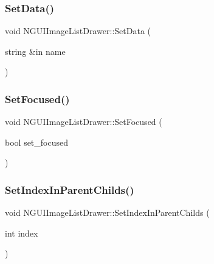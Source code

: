 \hypertarget{class_n_g_u_i_image_list_drawer_aa61af0b4d9172fee0f9d5eaf126655ef}{}\label{class_n_g_u_i_image_list_drawer_aa61af0b4d9172fee0f9d5eaf126655ef} 
\subsubsection{\texorpdfstring{Set\+Data()}{SetData()}}
{\footnotesize\ttfamily void N\+G\+U\+I\+Image\+List\+Drawer\+::\+Set\+Data (\begin{DoxyParamCaption}\item[{string \&in}]{name }\end{DoxyParamCaption})}

\hypertarget{class_n_g_u_i_image_list_drawer_aee14247f4122119881efc74058df95a9}{}\label{class_n_g_u_i_image_list_drawer_aee14247f4122119881efc74058df95a9} 
\subsubsection{\texorpdfstring{Set\+Focused()}{SetFocused()}}
{\footnotesize\ttfamily void N\+G\+U\+I\+Image\+List\+Drawer\+::\+Set\+Focused (\begin{DoxyParamCaption}\item[{bool}]{set\+\_\+focused }\end{DoxyParamCaption})}

\hypertarget{class_n_g_u_i_image_list_drawer_ae371a161a5d33bb8edce85c52e6d97fa}{}\label{class_n_g_u_i_image_list_drawer_ae371a161a5d33bb8edce85c52e6d97fa} 
\subsubsection{\texorpdfstring{Set\+Index\+In\+Parent\+Childs()}{SetIndexInParentChilds()}}
{\footnotesize\ttfamily void N\+G\+U\+I\+Image\+List\+Drawer\+::\+Set\+Index\+In\+Parent\+Childs (\begin{DoxyParamCaption}\item[{int}]{index }\end{DoxyParamCaption})}

